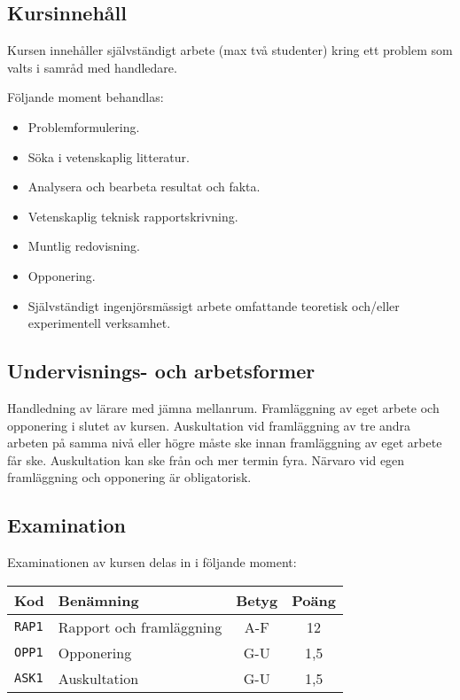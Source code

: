 \subsection*{Kursinnehåll}

Kursen innehåller självständigt arbete (max två studenter) kring ett
problem som valts i samråd med handledare.

Följande moment behandlas:

\begin{itemize}
\tightlist
\item
  Problemformulering.
\item
  Söka i vetenskaplig litteratur.
\item
  Analysera och bearbeta resultat och fakta.
\item
  Vetenskaplig teknisk rapportskrivning.
\item
  Muntlig redovisning.
\item
  Opponering.
\item
  Självständigt ingenjörsmässigt arbete omfattande teoretisk och/eller
  experimentell verksamhet.
\end{itemize}

\subsection*{Undervisnings- och
arbetsformer}

Handledning av lärare med jämna mellanrum. Framläggning av eget arbete
och opponering i slutet av kursen. Auskultation vid framläggning av tre
andra arbeten på samma nivå eller högre måste ske innan framläggning av
eget arbete får ske. Auskultation kan ske från och mer termin fyra.
Närvaro vid egen framläggning och opponering är obligatorisk.

\subsection*{Examination}

Examinationen av kursen delas in i följande moment:

\begin{longtable}[]{@{}llcc@{}}
\toprule
\textsf{Kod} & \textsf{Benämning} & \textsf{Betyg} & \textsf{Poäng}\tabularnewline
\midrule
\endhead
\texttt{RAP1} & Rapport och framläggning & A-F & 12\tabularnewline
\texttt{OPP1} & Opponering & G-U & 1,5\tabularnewline
\texttt{ASK1} & Auskultation & G-U & 1,5\tabularnewline
\bottomrule
\end{longtable}

